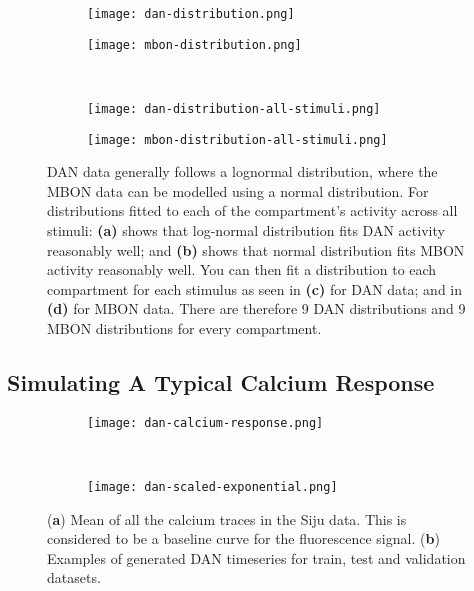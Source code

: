 \documentclass[11pt, A4]{article}
\begin{document}
\begin{multicols}{2}
\begin{figure*}
	\centering
	\begin{subfigure}[b]{0.49\textwidth}
		\centering
        		\texttt{[image: dan-distribution.png]}
        		\caption{}
        		\label{fig:dan-distribution}
     	\end{subfigure}
     	\hfill
     	\begin{subfigure}[b]{0.49\textwidth}
         	\centering
         	\texttt{[image: mbon-distribution.png]}
        		\caption{}
         	\label{fig:mbon-distribution}
     	\end{subfigure}
	~
	\begin{subfigure}[b]{0.48\textwidth}
		\centering
        		\texttt{[image: dan-distribution-all-stimuli.png]}
        		\caption{}
        		\label{fig:dan-distribution-all-stimuli}
     	\end{subfigure}
     	\hfill
     	\begin{subfigure}[b]{0.48\textwidth}
         	\centering
         	\texttt{[image: mbon-distribution-all-stimuli.png]}
        		\caption{}
         	\label{fig:mbon-distribution-all-stimuli}
     	\end{subfigure}
	\caption{
	DAN data generally follows a lognormal distribution, where the MBON data can be modelled using a normal distribution. For distributions fitted to each of the compartment's activity across all stimuli:
	\textbf{(a)} shows that log-normal distribution fits DAN activity reasonably well; and
	\textbf{(b)} shows that normal distribution fits MBON activity reasonably well. You can then fit a distribution to each compartment for each stimulus as seen in 
	\textbf{(c)} for DAN data; and in
	\textbf{(d)} for MBON data.
	There are therefore 9 DAN distributions and 9 MBON distributions for every compartment.
	}
	\label{fig:data-distributions}
\end{figure*}


\subsection{Simulating A Typical Calcium Response}

\begin{figure}[H]
	\centering
	\begin{subfigure}[b]{0.37\textwidth}
		\centering
        		\caption{}
        		\texttt{[image: dan-calcium-response.png]}
        		\label{fig:dan-calcium-response}
     	\end{subfigure}
     	~
     	\begin{subfigure}[b]{0.36\textwidth}
         	\centering
        		\caption{}
         	\texttt{[image: dan-scaled-exponential.png]}
         	\label{fig:dan-scaled-exponential}
     	\end{subfigure}
	\caption{
		(\textbf{a})  Mean of all the calcium traces in the Siju data. This is considered to be a baseline curve for the fluorescence signal.
		(\textbf{b})  Examples of generated DAN timeseries for train, test and validation datasets.
	}
\end{figure}



\end{multicols}
\end{document}
